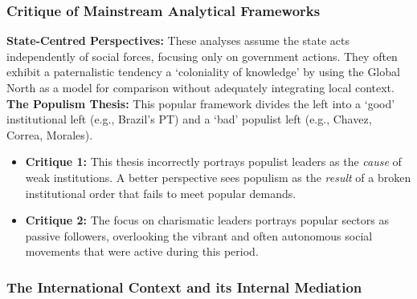 \documentclass{article}
\begin{document}
    \subsubsection{Critique of Mainstream Analytical Frameworks}

    \noindent \textbf{State-Centred Perspectives:} These analyses assume the
state acts independently of social forces, focusing only on government
actions. They often exhibit a paternalistic tendency a `coloniality of
knowledge' by using the Global North as a model for comparison without
adequately integrating local context.\\

  \noindent \textbf{The Populism Thesis:} This popular framework divides the
left into a `good' institutional left (e.g., Brazil's PT) and a `bad'
populist left (e.g., Chavez, Correa, Morales).
    \begin{itemize}
        \item \textbf{Critique 1:} This thesis incorrectly portrays populist
        leaders as the \textit{cause} of weak institutions. A better
        perspective sees populism as the \textit{result} of a broken
        institutional order that fails to meet popular demands.
        \item \textbf{Critique 2:} The focus on charismatic leaders portrays
        popular sectors as passive followers, overlooking the vibrant and
        often autonomous social movements that were active during this period.
    \end{itemize}

    \subsubsection{The International Context and its Internal Mediation}
\end{document}
